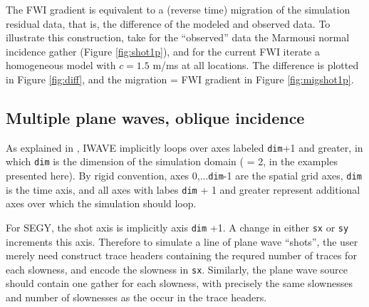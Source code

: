 
The FWI gradient is equivalent to a (reverse time) migration of the simulation residual data, that is, the difference of the modeled and observed data. To illustrate this construction, take for the ``observed'' data the Marmousi normal incidence gather (Figure \ref{fig:shot1p}), and for the current FWI iterate a homogeneous model with $c = 1.5$ m/ms at all locations. The difference is plotted in Figure \ref{fig:diff}, and the migration = FWI gradient in Figure \ref{fig:migshot1p}. 



\subsection{Multiple plane waves, oblique incidence}

As explained  in \cite[]{trip14:struct}, IWAVE implicitly loops over axes labeled {\tt dim}+1 and greater, in which {\tt dim} is the dimension of the simulation domain ( = 2, in the examples presented here). By rigid convention, axes 0,...{\tt dim}-1 are the spatial grid axes, {\tt dim} is the time axis, and all axes with labes {\tt dim} + 1 and greater represent additional axes over which the simulation should loop.

For SEGY, the shot axis is implicitly axis {\tt dim} +1. A change in either {\tt sx} or {\tt sy} increments this axis. Therefore to simulate a line of plane wave ``shots'', the user merely need construct trace headers containing the requred number of traces for each slowness, and encode the slowness in {\tt sx}. Similarly, the plane wave source should contain one gather for each slowness, with precisely the same slownesses and number of slownesses as the occur in the trace headers.

